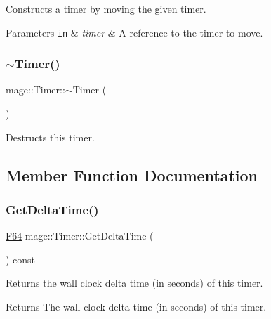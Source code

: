 Constructs a timer by moving the given timer.


\begin{DoxyParams}[1]{Parameters}
\mbox{\tt in}  & {\em timer} & A reference to the timer to move. \\
\hline
\end{DoxyParams}
\hypertarget{classmage_1_1_timer_a66d6964a6d42eef72f7312f1233e4f74}{}\label{classmage_1_1_timer_a66d6964a6d42eef72f7312f1233e4f74} 
\subsubsection{\texorpdfstring{$\sim$\+Timer()}{~Timer()}}
{\footnotesize\ttfamily mage\+::\+Timer\+::$\sim$\+Timer (\begin{DoxyParamCaption}{ }\end{DoxyParamCaption})\hspace{0.3cm}{\ttfamily [default]}}

Destructs this timer. 

\subsection{Member Function Documentation}
\hypertarget{classmage_1_1_timer_a49d36d6d60530a55af210abd01577365}{}\label{classmage_1_1_timer_a49d36d6d60530a55af210abd01577365} 
\subsubsection{\texorpdfstring{Get\+Delta\+Time()}{GetDeltaTime()}}
{\footnotesize\ttfamily \hyperlink{namespacemage_ad26233bbec640deda836e572c1a23708}{F64} mage\+::\+Timer\+::\+Get\+Delta\+Time (\begin{DoxyParamCaption}{ }\end{DoxyParamCaption}) const\hspace{0.3cm}{\ttfamily [noexcept]}}

Returns the wall clock delta time (in seconds) of this timer.

\begin{DoxyReturn}{Returns}
The wall clock delta time (in seconds) of this timer. 
\end{DoxyReturn}
\hypertarget{classmage_1_1_timer_a21ee76bc048a3c80f1bfbbbd807e97a7}{}\label{classmage_1_1_timer_a21ee76bc048a3c80f1bfbbbd807e97a7} 
